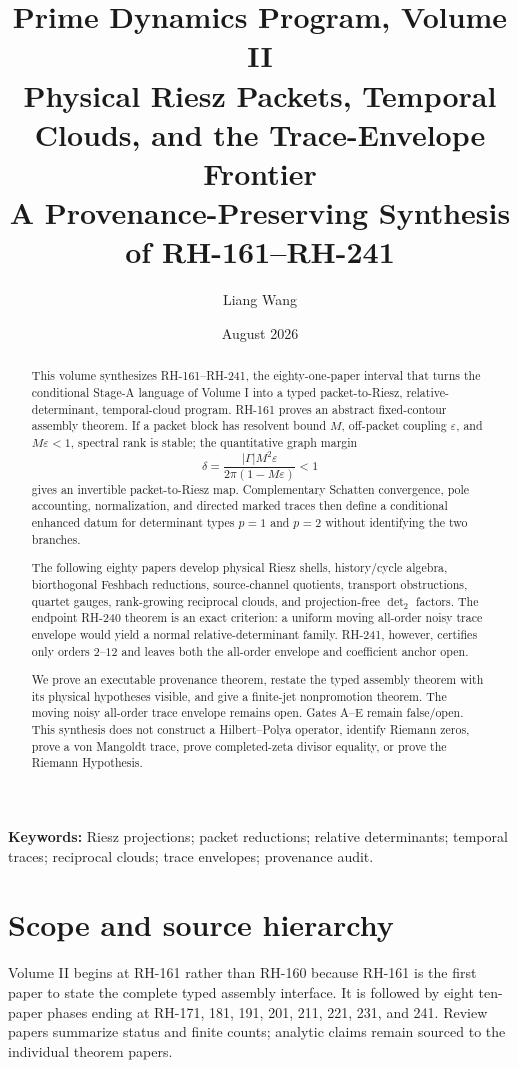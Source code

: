 \documentclass[11pt]{article}
\title{\textbf{Prime Dynamics Program, Volume II}\\
\Large Physical Riesz Packets, Temporal Clouds, and the Trace-Envelope Frontier\\
\large A Provenance-Preserving Synthesis of RH-161--RH-241}
\author{Liang Wang}
\date{August 2026}
\theoremstyle{definition}
\theoremstyle{remark}
\begin{document}
\maketitle

\begin{abstract}
This volume synthesizes RH-161--RH-241, the eighty-one-paper interval that
turns the conditional Stage-A language of Volume I into a typed
packet-to-Riesz, relative-determinant, temporal-cloud program.  RH-161 proves
an abstract fixed-contour assembly theorem.  If a packet block has resolvent
bound $M$, off-packet coupling $\varepsilon$, and $M\varepsilon<1$, spectral
rank is stable; the quantitative graph margin
\[
 \delta=\frac{|\Gamma|M^2\varepsilon}
 {2\pi(1-M\varepsilon)}<1
\]
gives an invertible packet-to-Riesz map.  Complementary Schatten convergence,
pole accounting, normalization, and directed marked traces then define a
conditional enhanced datum for determinant types $p=1$ and $p=2$ without
identifying the two branches.

The following eighty papers develop physical Riesz shells, history/cycle
algebra, biorthogonal Feshbach reductions, source-channel quotients, transport
obstructions, quartet gauges, rank-growing reciprocal clouds, and
projection-free $\det_2$ factors.  The endpoint RH-240 theorem is an exact
criterion: a uniform moving all-order noisy trace envelope would yield a
normal relative-determinant family.  RH-241, however, certifies only orders
$2$--$12$ and leaves both the all-order envelope and coefficient anchor open.

We prove an executable provenance theorem, restate the typed assembly theorem
with its physical hypotheses visible, and give a finite-jet nonpromotion
theorem.  The moving noisy all-order trace envelope remains open.  Gates A--E
remain false/open.  This synthesis does not construct a Hilbert--Polya
operator, identify Riemann zeros, prove a von Mangoldt trace, prove
completed-zeta divisor equality, or prove the Riemann Hypothesis.
\end{abstract}

\noindent\textbf{Keywords:} Riesz projections; packet reductions; relative
determinants; temporal traces; reciprocal clouds; trace envelopes;
provenance audit.

\section{Scope and source hierarchy}

Volume II begins at RH-161 rather than RH-160 because RH-161 is the first
paper to state the complete typed assembly interface.  It is followed by
eight ten-paper phases ending at RH-171, 181, 191, 201, 211, 221, 231, and
241.  Review papers summarize status and finite counts; analytic claims
remain sourced to the individual theorem papers.
\end{document}
